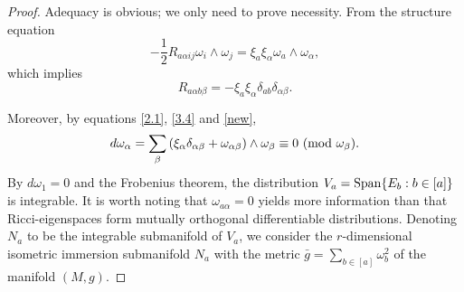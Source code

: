 \documentclass{amsart}
\theoremstyle{definition}
\theoremstyle{remark}
\numberwithin{equation}{section}
\begin{document}
	\begin{proof}
		Adequacy is obvious; we only need to prove necessity.
		From the structure equation 
		\[
		-\frac{1}{2}R_{a\alpha ij}\omega_{i}\wedge\omega_{j}=\xi_a\xi_\alpha \omega_{a}\wedge\omega_{\alpha},
		\]
		which implies	
		\begin{equation}\label{3.9}
			R_{a\alpha b \beta}=-\xi_a\xi_\alpha \delta_{ab}\delta_{\alpha\beta}.
		\end{equation}		
		
		
		
		Moreover, by equations \eqref{2.1}, \eqref{3.4} and \eqref{new}, 
		\[
		d\omega_\alpha=\sum_\beta\left( \xi_\alpha\delta_{\alpha\beta}
		+\omega_{\alpha\beta} \right) \wedge \omega_{\beta}  \equiv 0 
		~ ( {\rm mod} ~ \omega_\beta).
		\]
		By $d\omega_1=0$ and the Frobenius theorem, the distribution
		$V_a={\rm Span} \{E_b: b\in [a] \} $ is integrable.
		It is worth noting that $\omega_{a\alpha}=0$ yields more information than that Ricci-eigenspaces form mutually orthogonal differentiable distributions. Denoting $N_a$ to be the integrable submanifold of $V_a$, 
		we consider the $r$-dimensional isometric immersion submanifold $N_a$ with the metric 
		$\bar{g}=\sum_{b \in [a]} \omega^2_{b}$
		of the manifold $(M,g)$.
		

\end{proof}
\end{document}
